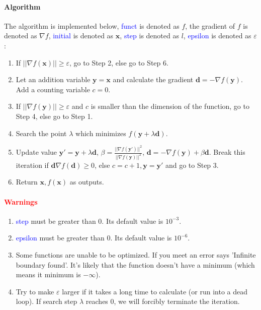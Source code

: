 \documentclass{article}
\begin{document}
\paragraph{Algorithm}
The algorithm is implemented below, \textcolor{blue}{funct} is denoted as $f$, the gradient of $f$ is denoted as $\nabla f$, \textcolor{blue}{initial} is denoted as $\mathbf{x}$, \textcolor{blue}{step} is denoted as $l$, \textcolor{blue}{epsilon} is denoted as $\varepsilon$:
\begin{enumerate}
    \item If $||\nabla f(\mathbf{x})|| \geqslant \varepsilon$, go to Step 2, else go to Step 6.
    \item Let an addition variable $\mathbf{y} = \mathbf{x}$ and calculate the gradient $\mathbf{d} = -\nabla f(\mathbf{y})$. Add a counting variable $c = 0$.
    \item If $||\nabla f(\mathbf{y})|| \geqslant \varepsilon$ and $c$ is smaller than the dimension of the function, go to Step 4, else go to Step 1.
    \item Search the point $\lambda$ which minimizes $f(\mathbf{y} + \lambda \mathbf{d})$.
    \item Update value $\mathbf{y'} = \mathbf{y} + \lambda \mathbf{d}$, $\beta = \frac{||\nabla f(\mathbf{y'})||^2}{||\nabla f(\mathbf{y})||^2}$, $\mathbf{d} = -\nabla f(\mathbf{y}) + \beta \mathbf{d}$. Break this iteration if $ \mathbf{d}\nabla f(\mathbf{d}) \geqslant 0$, else $c = c + 1, \mathbf{y} = \mathbf{y'}$ and go to Step 3.
    \item Return $\mathbf{x}, f(\mathbf{x})$ as outputs.
\end{enumerate}

\paragraph{\textcolor{red}{Warnings}}
\begin{enumerate}
    \item \textcolor{blue}{step} must be greater than $0$. Its default value is $10^{-3}$.
    \item \textcolor{blue}{epsilon} must be greater than $0$. Its default value is $10^{-6}$.
    \item Some functions are unable to be optimized. If you meet an error says 'Infinite boundary found'. It's likely that the function doesn't have a minimum (which means it minimum is $-\infty$).
    \item Try to make $\varepsilon$ larger if it takes a long time to calculate (or run into a dead loop). If search step $\lambda$ reaches $0$, we will forcibly terminate the iteration.
\end{enumerate}
\end{document}
